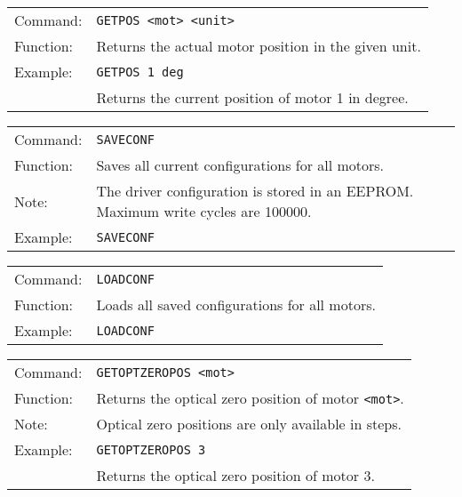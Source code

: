 \vspace{\vdistace}

\begin{table}[h]
  \begin{tabularx}{\textwidth}{lX}
    Command:  & \texttt{GETPOS <mot> <unit>}\\
    Function: & Returns the actual motor position in the given unit.\\
    Example:  & \texttt{GETPOS 1 deg} \\
              & Returns the current position of motor 1 in degree.
  \end{tabularx}
\end{table}

\vspace{\vdistace}

\begin{table}[h]
  \begin{tabularx}{\textwidth}{lX}
    Command:  & \texttt{SAVECONF}\\
    Function: & Saves all current configurations for all motors.\\
    Note:     & The driver configuration is stored in an EEPROM.
		            Maximum write cycles are 100000.\\
    Example:  & \texttt{SAVECONF}
  \end{tabularx}
\end{table}

\vspace{\vdistace}

\begin{table}[h]
  \begin{tabularx}{\textwidth}{lX}
    Command:  & \texttt{LOADCONF}\\
    Function: & Loads all saved configurations for all motors.\\
    Example:  & \texttt{LOADCONF}
  \end{tabularx}
\end{table}

\vspace{\vdistace}
\clearpage

\begin{table}[h]
  \begin{tabularx}{\textwidth}{lX}
    Command:  & \texttt{GETOPTZEROPOS <mot>}\\
    Function: & Returns the optical zero position of motor \texttt{<mot>}.\\
    Note:     & Optical zero positions are only available in steps.\\
    Example:  & \texttt{GETOPTZEROPOS 3}\\
              & Returns the optical zero position of motor 3.
  \end{tabularx}
\end{table}

